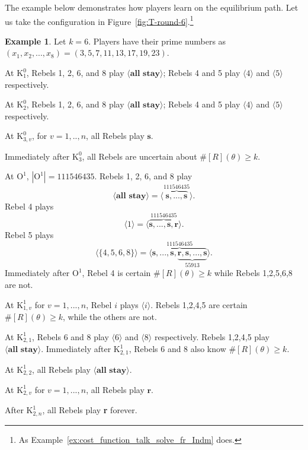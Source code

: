 \documentclass[12pt,letter]{article}
\newcommand{\Kappa}{\mathrm{K}}
\newcommand{\Omicron}{\mathrm{O}}
\theoremstyle{definition}
\newtheorem{example}{Example}
\theoremstyle{remark}
\theoremstyle{claim}
\begin{document}
The example below demonstrates how players learn on the equilibrium path. Let us take the configuration in Figure~\ref{fig:T-round-6}.\footnote{As Example~\ref{ex:cost_function_talk_solve_fr_Indm} does.}
\begin{example}
Let $k=6$. Players have their prime numbers as $(x_1,x_2,...,x_8)=(3,5,7,11,13,17,19,23)$.

At $\Kappa^0_{1}$, Rebels 1, 2, 6, and 8 play $\langle \textbf{all stay} \rangle$; Rebels 4 and 5 play $\langle 4 \rangle$ and $\langle 5 \rangle$ respectively. 

At $\Kappa^0_{2}$, Rebels 1, 2, 6, and 8 play $\langle \textbf{all stay} \rangle$; Rebels 4 and 5 play $\langle 4 \rangle$ and $\langle 5 \rangle$ respectively.

At $\Kappa^0_{3,v}$, for $v=1,..,n$, all Rebels play $\textbf{s} $. 

Immediately after $\Kappa^0_{3}$, all Rebels are uncertain about $\# [R](\theta)\geq k$.

At $\Omicron^1$, $|\Omicron^1|=111546435$. Rebels 1, 2, 6, and 8 play 
\[\langle \textbf{all stay} \rangle=\langle \overbrace{\textbf{s},...,\textbf{s}}^{111546435} \rangle.\] Rebel 4 plays 
\[\langle 1 \rangle=\langle \overbrace{\textbf{s},...,\textbf{s},\textbf{r}}^{111546435} \rangle.\] Rebel 5 plays 
\[\langle \{4,5,6,8\} \rangle=\langle \overbrace{\textbf{s},...,\textbf{s},\underbrace{\textbf{r},\textbf{s},...,\textbf{s}}_{55913}}^{111546435} \rangle.\] Immediately after $\Omicron^1$, Rebel 4 is certain $\# [R](\theta)\geq k$ while Rebels 1,2,5,6,8 are not.

At $\Kappa^1_{1,v}$ for $v=1,...,n$, Rebel $i$ plays $\langle i \rangle$. Rebels 1,2,4,5 are certain $\# [R](\theta)\geq k$, while the others are not.

At $\Kappa^1_{2,1}$, Rebels 6 and 8 play $\langle 6 \rangle$ and $\langle 8 \rangle$ respectively. Rebels 1,2,4,5 play $\langle \textbf{all stay} \rangle$. Immediately after $\Kappa^1_{2,1}$, Rebels 6 and 8 also know $\# [R](\theta)\geq k$.

At $\Kappa^1_{2,2}$, all Rebels play $\langle \textbf{all stay} \rangle$.

At $\Kappa^1_{2,v}$ for $v=1,...,n$, all Rebels play $\textbf{r}$. 

After $\Kappa^1_{2,n}$, all Rebels play \textbf{r} forever. 



\end{example}
\end{document}
